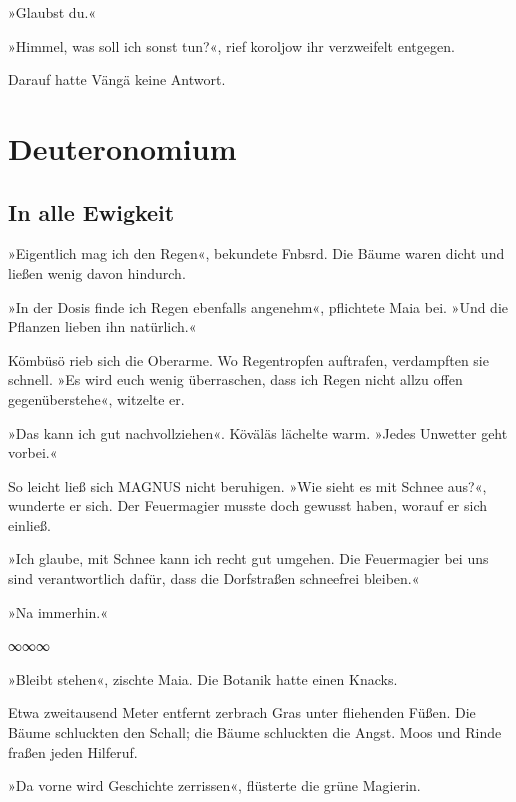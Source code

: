 »Glaubst du.«

»Himmel, was soll ich sonst tun?«, rief koroljow ihr verzweifelt entgegen.

Darauf hatte Vängä keine Antwort.

\cleardoubleevenpage




\part{Deuteronomium}

\chapter{In alle Ewigkeit}

»Eigentlich mag ich den Regen«, bekundete Fnbsrd. Die Bäume waren dicht und ließen wenig davon hindurch.

»In der Dosis finde ich Regen ebenfalls angenehm«, pflichtete Maia bei. »Und die Pflanzen lieben ihn natürlich.«

Kömbüsö rieb sich die Oberarme. Wo Regentropfen auftrafen, verdampften sie schnell. »Es wird euch wenig überraschen, dass ich Regen nicht allzu offen gegenüberstehe«, witzelte er.

»Das kann ich gut nachvollziehen«. Köväläs lächelte warm. »Jedes Unwetter geht vorbei.«

So leicht ließ sich MAGNUS nicht beruhigen. »Wie sieht es mit Schnee aus?«, wunderte er sich. Der Feuermagier musste doch gewusst haben, worauf er sich einließ.

»Ich glaube, mit Schnee kann ich recht gut umgehen. Die Feuermagier bei uns sind verantwortlich dafür, dass die Dorfstraßen schneefrei bleiben.«

»Na immerhin.«

\begin{center}
∞∞∞
\end{center}

»Bleibt stehen«, zischte Maia. Die Botanik hatte einen Knacks.

Etwa zweitausend Meter entfernt zerbrach Gras unter fliehenden Füßen. Die Bäume schluckten den Schall; die Bäume schluckten die Angst. Moos und Rinde fraßen jeden Hilferuf.

»Da vorne wird Geschichte zerrissen«, flüsterte die grüne Magierin.

